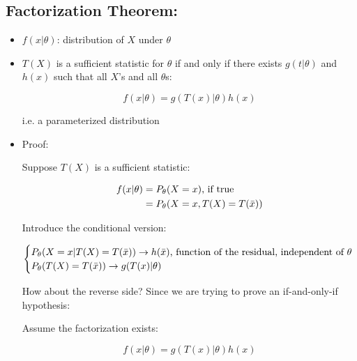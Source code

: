\documentclass[11pt,letterpaper,titlepage]{article}
\begin{document}
\subsection{Factorization Theorem:}

\begin{itemize}
    
    \item $f(x|\theta)$: distribution of $X$ under $\theta$
    
    \item $T(X)$ is a sufficient statistic for $\theta$ if and only if there exists $g(t|\theta)$ and $h(x)$ such that all $X$'s and all $\theta$s:
    
    \begin{equation*}
        f(x|\theta) = g(T(x)|\theta)h(x)
    \end{equation*}
    
    i.e. a parameterized distribution
    
    \item Proof:
    
    Suppose $T(X)$ is a sufficient statistic:
    
    \begin{equation*}
        \begin{aligned}
            f(x|\theta) &= P_{\theta}(X = x) \text{, if true} \\
            &= P_{\theta}(X = x, T(X) = T(\Bar{x}))
        \end{aligned}
    \end{equation*}
    
    Introduce the conditional version:
    
    \begin{gather*}
        \begin{cases}
            P_{\theta}(X = x | T(X) = T(\Bar{x})) \rightarrow h(\Bar{x}) \text{, function of the residual, independent of }\theta \\
            P_{\theta}(T(X) = T(\Bar{x})) \rightarrow g(T(x)|\theta)
        \end{cases}
    \end{gather*}
    
    How about the reverse side? Since we are trying to prove an if-and-only-if hypothesis:
    
    Assume the factorization exists:
    
    \begin{equation*}
        f(x|\theta) = g(T(x)|\theta)h(x)
    \end{equation*}
    

\end{itemize}
\end{document}
